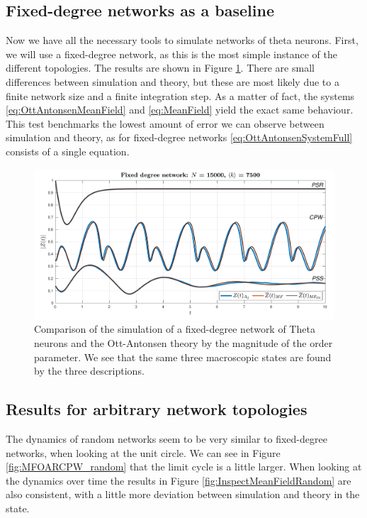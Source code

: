 \subsection{Fixed-degree networks as a baseline}
Now we have all the necessary tools to simulate networks of theta neurons. First, we will use a fixed-degree network, as this is the most simple instance of the different topologies. The results are shown in Figure \ref{fig:InspectMeanFieldFixedDegree}.
There are small differences between simulation and theory, but these are most likely due to a finite network size and a finite integration step. As a matter of fact, the systems \eqref{eq:OttAntonsenMeanField} and \eqref{eq:MeanField} yield the exact same behaviour. This test benchmarks the lowest amount of error we can observe between simulation and theory, as for fixed-degree networks \eqref{eq:OttAntonsenSystemFull} consists of a single equation.
\begin{figure}[H]
\centering
\includegraphics[width = \textwidth]{../Figures/InspectMeanFieldFixedDegree.pdf}
\caption{Comparison of the simulation of a fixed-degree network of Theta neurons and the Ott-Antonsen theory by the magnitude of the order parameter. We see that the same three macroscopic states are found by the three descriptions.}
\label{fig:InspectMeanFieldFixedDegree}
\end{figure}


\subsection{Results for arbitrary network topologies}
The dynamics of random networks seem to be very similar to fixed-degree networks, when looking at the unit circle. We can see in Figure \ref{fig:MFOARCPW_random} that the limit cycle is a little larger. When looking at the dynamics over time the results in Figure \ref{fig:InspectMeanFieldRandom} are also consistent, with a little more deviation between simulation and theory in the \CPW state.

